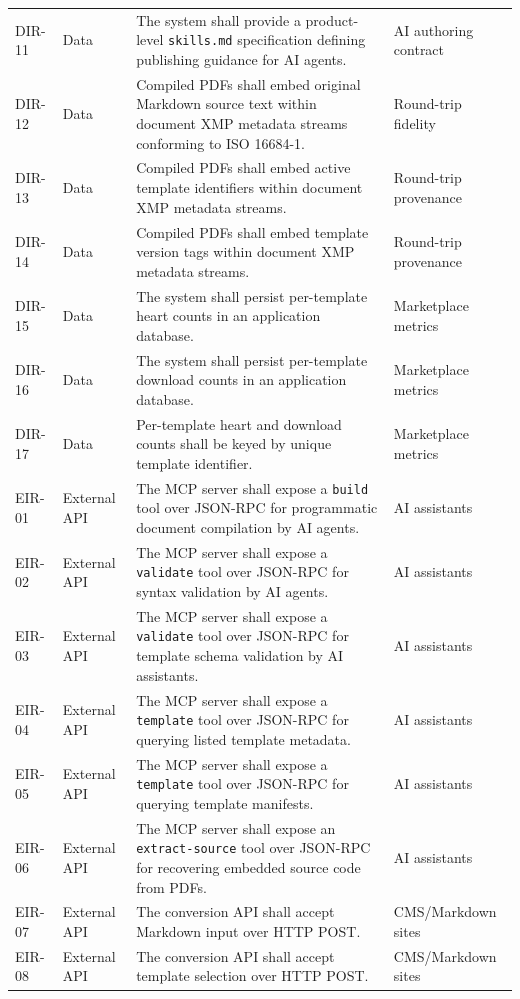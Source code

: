 \begin{xltabular}{\textwidth}{@{}p{0.12\textwidth}p{0.19\textwidth}X X@{}}
DIR-11 & Data & The system shall provide a product-level \texttt{skills.md} specification defining publishing guidance for AI agents. & AI authoring contract \\
DIR-12 & Data & Compiled PDFs shall embed original Markdown source text within document XMP metadata streams conforming to ISO 16684-1. & Round-trip fidelity \\
DIR-13 & Data & Compiled PDFs shall embed active template identifiers within document XMP metadata streams. & Round-trip provenance \\
DIR-14 & Data & Compiled PDFs shall embed template version tags within document XMP metadata streams. & Round-trip provenance \\
DIR-15 & Data & The system shall persist per-template heart counts in an application database. & Marketplace metrics \\
DIR-16 & Data & The system shall persist per-template download counts in an application database. & Marketplace metrics \\
DIR-17 & Data & Per-template heart and download counts shall be keyed by unique template identifier. & Marketplace metrics \\
EIR-01 & External API & The MCP server shall expose a \texttt{build} tool over JSON-RPC for programmatic document compilation by AI agents. & AI assistants \\
EIR-02 & External API & The MCP server shall expose a \texttt{validate} tool over JSON-RPC for syntax validation by AI agents. & AI assistants \\
EIR-03 & External API & The MCP server shall expose a \texttt{validate} tool over JSON-RPC for template schema validation by AI assistants. & AI assistants \\
EIR-04 & External API & The MCP server shall expose a \texttt{template} tool over JSON-RPC for querying listed template metadata. & AI assistants \\
EIR-05 & External API & The MCP server shall expose a \texttt{template} tool over JSON-RPC for querying template manifests. & AI assistants \\
EIR-06 & External API & The MCP server shall expose an \texttt{extract-source} tool over JSON-RPC for recovering embedded source code from PDFs. & AI assistants \\
EIR-07 & External API & The conversion API shall accept Markdown input over HTTP POST. & CMS/Markdown sites \\
EIR-08 & External API & The conversion API shall accept template selection over HTTP POST. & CMS/Markdown sites \\

\end{xltabular}
